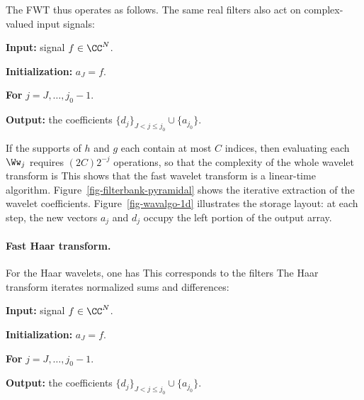 
The FWT thus operates as follows. The same real filters also act on complex-valued input signals:
\begin{rs}
	\item \textbf{Input:} signal $f \in \CC^N$.
	\item \textbf{Initialization:} $a_J = f$.
	\item \textbf{For} $j=J,\ldots,j_0-1$.
	\item \textbf{Output:} the coefficients $\{d_j\}_{J<j\leq j_0} \cup \{ a_{j_0} \}$.
\end{rs}

If the supports of $h$ and $g$ each contain at most $C$ indices, then evaluating each $\Ww_j$ requires $(2C) 2^{-j}$ operations, so that the complexity of the whole wavelet transform is
This shows that the fast wavelet transform is a linear-time algorithm.
%
Figure~\ref{fig-filterbank-pyramidal} shows the iterative extraction of the wavelet coefficients.
%
Figure~\ref{fig-wavalgo-1d} illustrates the storage layout: at each step, the new vectors $a_j$ and $d_j$ occupy the left portion of the output array.




\paragraph{Fast Haar transform.}

For the Haar wavelets, one has
This corresponds to the filters
The Haar transform iterates normalized sums and differences:
\begin{rs}
	\item \textbf{Input:} signal $f \in \CC^N$.
	\item \textbf{Initialization:} $a_J = f$.
	\item \textbf{For} $j=J,\ldots,j_0-1$.
	\item \textbf{Output:} the coefficients $\{d_j\}_{J<j\leq j_0} \cup \{ a_{j_0} \}$.
\end{rs}


